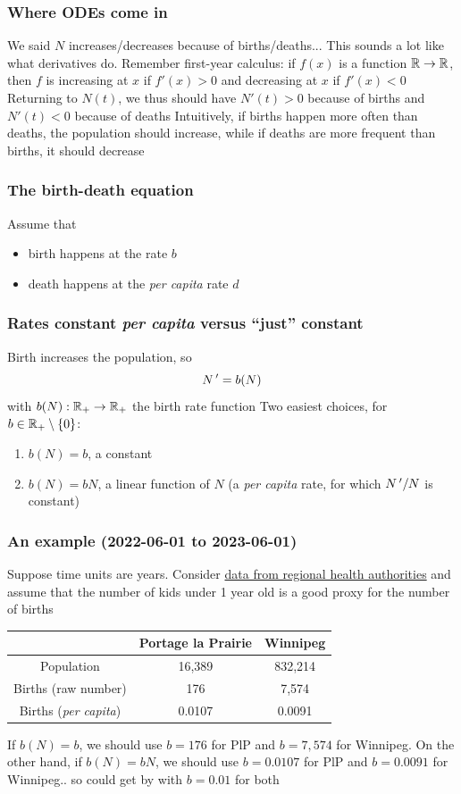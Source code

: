 \documentclass[aspectratio=169]{beamer}
\begin{document}
\begin{frame}\frametitle{Where ODEs come in}
We said $N$ increases/decreases because of births/deaths...
\vfill
This sounds a lot like what derivatives do. Remember first-year calculus: if $f(x)$ is a function $\mathbb{R}\to\mathbb{R}$, then $f$ is increasing at $x$ if $f'(x)>0$ and decreasing at $x$ if $f'(x)<0$
\vfill
Returning to $N(t)$, we thus should have $N'(t)>0$ because of births and $N'(t)<0$ because of deaths
\vfill
Intuitively, if births happen more often than deaths, the population should increase, while if deaths are more frequent than births, it should decrease
\end{frame}


\begin{frame}\frametitle{The birth-death equation}
Assume that
\vfill
\begin{itemize}
\item birth happens at the  rate $b$
\vfill
\item death happens at the \emph{per capita} rate $d$
\end{itemize}
\end{frame}

\begin{frame}\frametitle{Rates constant \emph{per capita} versus ``just'' constant}
Birth increases the population, so
\[
N\,' = b(N)
\]
with $b(N):\mathbb{R}_+\to\mathbb{R}_+$ the birth rate function
\vfill
Two easiest choices, for $b\in\mathbb{R}_+\setminus\{0\}$:
\begin{enumerate}
\item $b(N)=b$, a constant
\item $b(N)=bN$, a linear function of $N$ (a \emph{per capita} rate, for which $N\,'/N$ is constant)
\end{enumerate}
\end{frame}

\begin{frame}\frametitle{An example (2022-06-01 to 2023-06-01)}
Suppose time units are years. Consider \href{https://www.gov.mb.ca/health/population/pr2023.pdf}{data from regional health authorities} and assume that the number of kids under 1 year old is a good proxy for the number of births
\vfill
\begin{center}
\begin{tabular}{ccc}
\toprule
& Portage la Prairie & Winnipeg\\
\midrule
Population & 16,389 & 832,214 \\
Births (raw number) & 176 & 7,574 \\
Births (\emph{per capita}) & 0.0107 & 0.0091 \\
\end{tabular}
\end{center}
\vfill
If $b(N)=b$, we should use $b=176$ for PlP and $b=7,574$ for Winnipeg. On the other hand, if $b(N)=bN$, we should use $b=0.0107$ for PlP and $b=0.0091$ for Winnipeg.. so could get by with $b=0.01$ for both
\end{frame}
\end{document}
